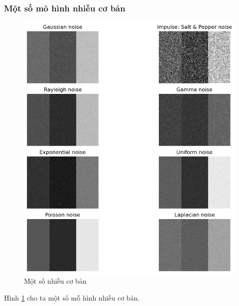 \documentclass{article}
\begin{document}
    \subsubsection*{Một số mô hình nhiễu cơ bản}
    \begin{figure}[ht!]
        \centering
        \includegraphics[width = \linewidth]{n1.png}
        \caption{Một số nhiễu cơ bản}
        \label{fig1}
    \end{figure}
    Hình \ref{fig1} cho ta một số mỗ hình nhiều cơ bản.
\end{document}
